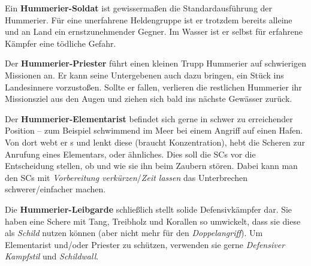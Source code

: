 Ein \textbf{Hummerier-Soldat} ist gewissermaßen die Standardausführung der Hummerier. Für eine unerfahrene Heldengruppe ist er trotzdem bereits alleine und an Land ein ernstzunehmender Gegner. Im Wasser ist er selbst für erfahrene Kämpfer eine tödliche Gefahr. 

Der \textbf{Hummerier-Priester} führt einen kleinen Trupp Hummerier auf schwierigen Missionen an. Er kann seine Untergebenen auch dazu bringen, ein Stück ins Landesinnere vorzustoßen. Sollte er fallen, verlieren die restlichen Hummerier ihr Missionsziel aus den Augen und ziehen sich bald ins nächste Gewässer zurück. 

Der \textbf{Hummerier-Elementarist} befindet sich gerne in schwer zu erreichender Position -- zum Beispiel schwimmend im Meer bei einem Angriff auf einen Hafen. Von dort webt er s und lenkt diese (braucht Konzentration), hebt die Scheren zur Anrufung eines Elementars, oder ähnliches. Dies soll die SCs vor die Entscheidung stellen, ob und wie sie ihn beim Zaubern stören. Dabei kann man den SCs mit \textit{Vorbereitung verkürzen}/\textit{Zeit lassen} das Unterbrechen schwerer/einfacher machen. 

Die \textbf{Hummerier-Leibgarde} schließlich stellt solide Defensivkämpfer dar. Sie haben eine Schere mit Tang, Treibholz und Korallen so umwickelt, dass sie diese als \textit{Schild} nutzen können (aber nicht mehr für den \textit{Doppelangriff}). Um Elementarist und/oder Priester zu schützen, verwenden sie gerne \textit{Defensiver Kampfstil} und \textit{Schildwall}.

\neuespalte


\kreaturhummeriersoldat
\kreaturhummerierleibgarde
\kreaturhummerierelementarist
\kreaturhummerierpriesterkrustentiere
\spaltenende